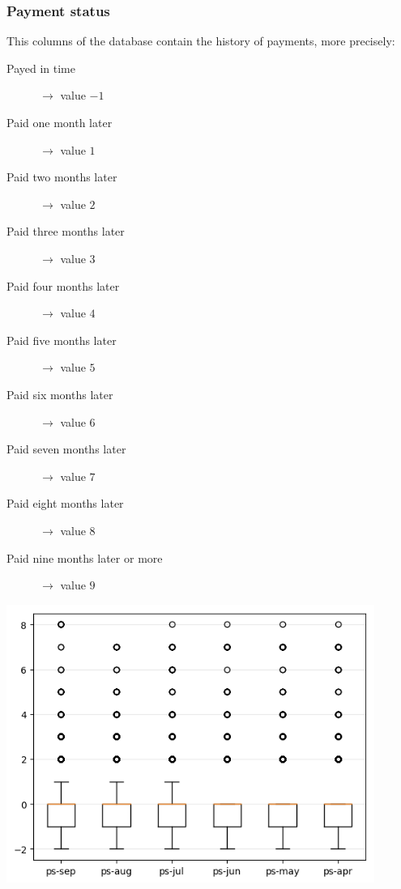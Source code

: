 \documentclass[a4paper]{article}
\begin{document}
\subsubsection{Payment status}
This columns of the database contain the history of payments, more precisely:
\begin{description}
  \item[\sc Payed in time]$\rightarrow$ value $-1$

  \item[\sc Paid one month later]$\rightarrow$ value $1$

  \item[\sc Paid two months later]$\rightarrow$ value $2$

  \item[\sc Paid three months later]$\rightarrow$ value $3$

  \item[\sc Paid four months later]$\rightarrow$ value $4$

  \item[\sc Paid five months later]$\rightarrow$ value $5$

  \item[\sc Paid six months later]$\rightarrow$ value $6$

  \item[\sc Paid seven months later]$\rightarrow$ value $7$

  \item[\sc Paid eight months later]$\rightarrow$ value $8$

  \item[\sc Paid nine months later or more]$\rightarrow$ value $9$
\end{description}
\begin{center}
\includegraphics[width=0.9\textwidth]{../Code/Gemma/boxplots/ps.png}
\end{center}
\end{document}
